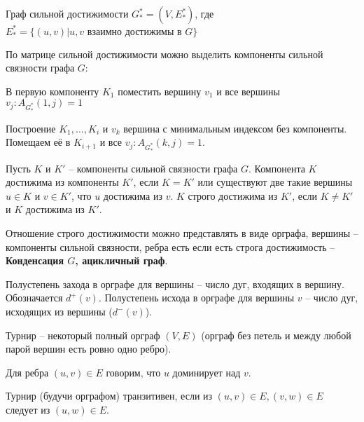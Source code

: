 	\begin{Def}
		Граф сильной достижимости $G_*^* = (V, E_*^*)$, 
		где $E_*^* = \{(u, v) | u, v \text{ взаимно достижимы в } G\}$ 
	\end{Def}

	По матрице сильной достижимости можно выделить компоненты сильной связности графа $G$:

	\begin{MyList}
		\item В первую компоненту $K_1$ поместить вершину $v_1$ и все вершины $v_j : A_{G_*^*}(1, j) = 1$
		\item Построение $K_1, ..., K_i$ и $v_k$ вершина с минимальным индексом без компоненты. Помещаем её в $K_{i + 1}$ и все $v_j : A_{G_*^*}(k, j) = 1$.   
	\end{MyList}

	\begin{Def}
		Пусть $K$ и $K'$ -- компоненты сильной связности графа $G$. Компонента $K$ достижима из компоненты $K'$, если $K = K'$ или существуют две такие вершины $u \in K$ и $v \in K'$, что $u$ достижима из $v$.
		$K$ строго достижима из $K'$, если $K \neq K'$ и $K$ достижима из $K'$.
	\end{Def}

	\begin{Def}
		Отношение строго достижимости можно представлять в виде орграфа, вершины -- компоненты сильной связности, ребра есть если есть строга достижимость -- \textbf{Конденсация $G$, ацикличный граф}. 
	\end{Def}


	\begin{Def}
		Полустепень захода в орграфе для вершины -- число дуг, входящих в вершину. Обозначается $d^+(v)$. Полустепень исхода в орграфе для вершины $v$ -- число дуг, исходящих из вершины ($d^-(v)$). 
	\end{Def}

	\begin{Def}
		Турнир -- некоторый полный орграф $(V, E)$ (орграф без петель и между любой парой вершин есть ровно одно ребро).
	\end{Def}

	\begin{Def}
		Для ребра $(u, v) \in E$ говорим, что $u$ доминирует над $v$.
	\end{Def}

	\begin{Def}
		Турнир (будучи орграфом) транзитивен, если из $(u, v) \in E, (v, w) \in E$ следует из $(u, w) \in E$.  
	\end{Def}


